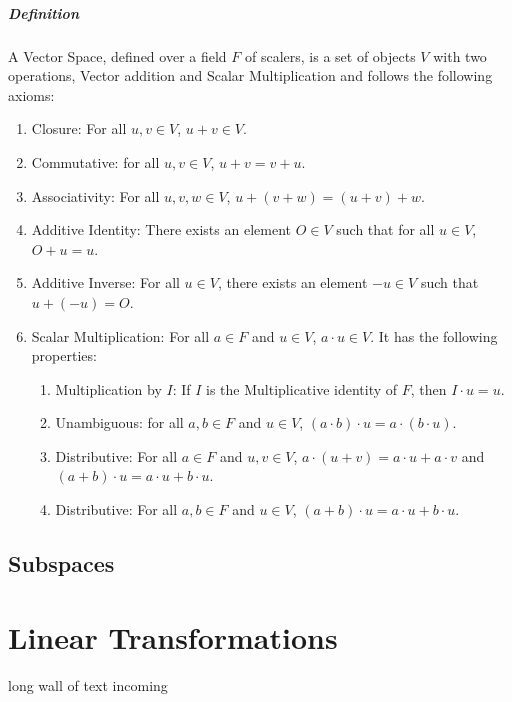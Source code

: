 \documentclass[12pt, oneside]{book}
\begin{document}
\paragraph{Definition} A Vector Space, defined over a field \( F \) of scalers, is a set of objects \(V\) with two operations, Vector addition and Scalar Multiplication and follows the following axioms:
\begin{enumerate}
    \item Closure: For all \( u,v \in V \), \(u + v \in V \).
    \item Commutative: for all \( u,v \in V \), \(u + v = v + u \).
    \item Associativity: For all \( u,v,w \in V \), \(u + (v + w) = (u + v) + w \).
    \item Additive Identity: There exists an element \( O \in V \) such that for all \( u \in V \), \(O + u = u \).
    \item Additive Inverse: For all \( u \in V \), there exists an element \( -u \in V \) such that \(u + (-u) = O \).
    \item Scalar Multiplication: For all \( a \in F \) and \( u \in V \), \(a \cdot u \in V \). It has the following properties:
    \begin{enumerate}
        \item Multiplication by \(I\): If \(I\) is the Multiplicative identity of \( F \), then \(I \cdot u = u \).
        \item Unambiguous: for all \( a,b \in F \) and \( u \in V \), \( (a \cdot b) \cdot u = a \cdot (b \cdot u) \).
        \item Distributive: For all \( a \in F \) and \( u,v \in V \), \( a \cdot (u + v) = a \cdot u + a \cdot v \) and \( (a + b) \cdot u = a \cdot u + b \cdot u \).
        \item Distributive: For all \( a,b \in F \) and \( u \in V \), \( (a + b) \cdot u = a \cdot u + b \cdot u \).
    \end{enumerate}
\end{enumerate}
\section{Subspaces}

\chapter{Linear Transformations}
long wall of text incoming
\end{document}
